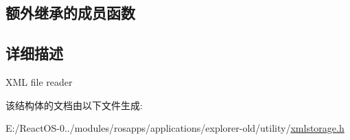 \subsection*{额外继承的成员函数}


\subsection{详细描述}
X\+ML file reader 

该结构体的文档由以下文件生成\+:\begin{DoxyCompactItemize}
\item 
E\+:/\+React\+O\+S-\/0../modules/rosapps/applications/explorer-\/old/utility/\hyperlink{xmlstorage_8h}{xmlstorage.\+h}\end{DoxyCompactItemize}
